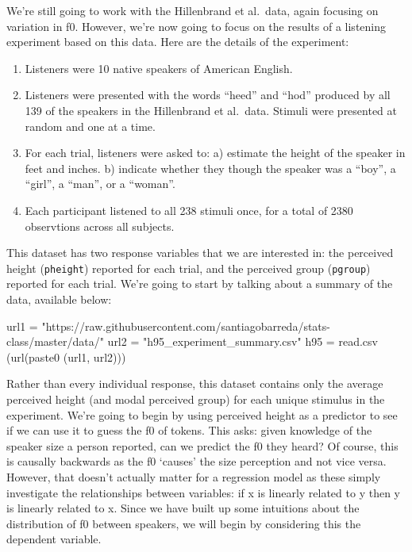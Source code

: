 \documentclass[
]{book}
\newenvironment{Shaded}{\begin{snugshade}}{\end{snugshade}}
\newcommand{\FunctionTok}[1]{\textcolor[rgb]{0.00,0.00,0.00}{#1}}
\newcommand{\NormalTok}[1]{#1}
\newcommand{\OtherTok}[1]{\textcolor[rgb]{0.56,0.35,0.01}{#1}}
\newcommand{\StringTok}[1]{\textcolor[rgb]{0.31,0.60,0.02}{#1}}
\begin{document}
We're still going to work with the Hillenbrand et al.~data, again focusing on variation in f0. However, we're now going to focus on the results of a listening experiment based on this data. Here are the details of the experiment:

\begin{enumerate}
\def\labelenumi{\arabic{enumi})}
\item
  Listeners were 10 native speakers of American English.
\item
  Listeners were presented with the words ``heed'' and ``hod'' produced by all 139 of the speakers in the Hillenbrand et al.~data. Stimuli were presented at random and one at a time.
\item
  For each trial, listeners were asked to:
  a) estimate the height of the speaker in feet and inches.
  b) indicate whether they though the speaker was a ``boy'', a ``girl'', a ``man'', or a ``woman''.
\item
  Each participant listened to all 238 stimuli once, for a total of 2380 observtions across all subjects.
\end{enumerate}

This dataset has two response variables that we are interested in: the perceived height (\texttt{pheight}) reported for each trial, and the perceived group (\texttt{pgroup}) reported for each trial. We're going to start by talking about a summary of the data, available below:

\begin{Shaded}
\begin{Highlighting}[]
\NormalTok{url1 }\OtherTok{=} \StringTok{"https://raw.githubusercontent.com/santiagobarreda/stats{-}class/master/data/"}
\NormalTok{url2 }\OtherTok{=} \StringTok{"h95\_experiment\_summary.csv"}
\NormalTok{h95 }\OtherTok{=} \FunctionTok{read.csv}\NormalTok{ (}\FunctionTok{url}\NormalTok{(}\FunctionTok{paste0}\NormalTok{ (url1, url2)))}
\end{Highlighting}
\end{Shaded}

Rather than every individual response, this dataset contains only the average perceived height (and modal perceived group) for each unique stimulus in the experiment. We're going to begin by using perceived height as a predictor to see if we can use it to guess the f0 of tokens. This asks: given knowledge of the speaker size a person reported, can we predict the f0 they heard? Of course, this is causally backwards as the f0 `causes' the size perception and not vice versa. However, that doesn't actually matter for a regression model as these simply investigate the relationships between variables: if x is linearly related to y then y is linearly related to x. Since we have built up some intuitions about the distribution of f0 between speakers, we will begin by considering this the dependent variable.
\end{document}
